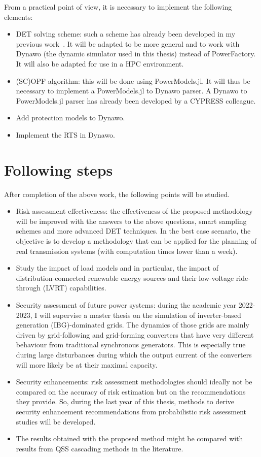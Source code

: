 From a practical point of view, it is necessary to implement the following elements:

\begin{itemize}
    \item DET solving scheme: such a scheme has already been developed in my previous work~\cite{MCDETasTool}. It will be adapted to be more general and to work with Dynawo (the dynamic simulator used in this thesis) instead of PowerFactory. It will also be adapted for use in a HPC environment.
    \item (SC)OPF algorithm: this will be done using PowerModels.jl. It will thus be necessary to implement a PowerModels.jl to Dynawo parser. A Dynawo to PowerModels.jl parser has already been developed by a CYPRESS colleague.
    \item Add protection models to Dynawo.
    \item Implement the RTS in Dynawo.
\end{itemize}


\section{Following steps}

After completion of the above work, the following points will be studied.

\begin{itemize}
    \item Risk assessment effectiveness: the effectiveness of the proposed methodology will be improved with the answers to the above questions, smart sampling schemes and more advanced DET techniques. In the best case scenario, the objective is to develop a methodology that can be applied for the planning of real transmission systems (with computation times lower than a week).
    \item Study the impact of load models and in particular, the impact of distribution-connected renewable energy sources and their low-voltage ride-through (LVRT) capabilities.
    \item Security assessment of future power systems: during the academic year 2022-2023, I will supervise a master thesis on the simulation of inverter-based generation (IBG)-dominated grids. The dynamics of those grids are mainly driven by grid-following and grid-forming converters that have very different behaviour from traditional synchronous generators. This is especially true during large disturbances during which the output current of the converters will more likely be at their maximal capacity.
    \item Security enhancements: risk assessment methodologies should ideally not be compared on the accuracy of risk estimation but on the recommendations they provide. So, during the last year of this thesis, methods to derive security enhancement recommendations from probabilistic risk assessment studies will be developed.
    \item The results obtained with the proposed method might be compared with results from QSS cascading methods in the literature.
\end{itemize}



